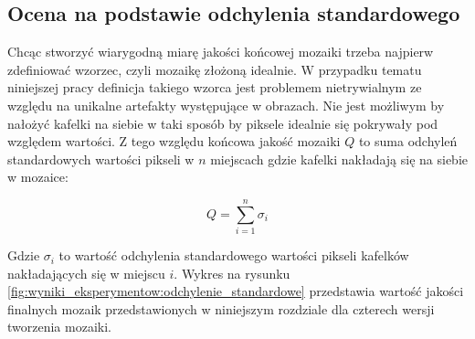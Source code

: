 \subsection{Ocena na podstawie odchylenia standardowego}
\label{sec:wyniki_eksperymentow:ochylenie_standardowe}

Chcąc stworzyć wiarygodną miarę jakości końcowej mozaiki trzeba najpierw zdefiniować wzorzec, czyli mozaikę złożoną idealnie. W przypadku tematu niniejszej pracy definicja takiego wzorca jest problemem nietrywialnym ze względu na unikalne artefakty występujące w obrazach. Nie jest możliwym by nałożyć kafelki na siebie w taki sposób by piksele idealnie się pokrywały pod względem wartości. Z tego względu końcowa jakość mozaiki $Q$ to suma odchyleń standardowych wartości pikseli w $n$ miejscach gdzie kafelki nakładają się na siebie w mozaice:

\begin{equation}
Q = \sum_{i=1}^{n} \sigma_{i}
\label{eq:standard_deviation}
\end{equation}

Gdzie $\sigma_{i}$ to wartość odchylenia standardowego wartości pikseli kafelków nakładających się w miejscu $i$. Wykres na rysunku \ref{fig:wyniki_eksperymentow:odchylenie_standardowe} przedstawia wartość jakości finalnych mozaik przedstawionych w niniejszym rozdziale dla czterech wersji tworzenia mozaiki.


